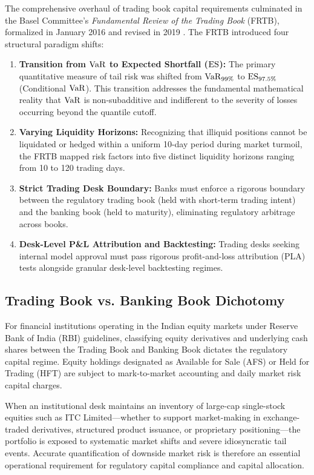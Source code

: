 The comprehensive overhaul of trading book capital requirements culminated in the Basel Committee's \textit{Fundamental Review of the Trading Book} (FRTB), formalized in January 2016 and revised in 2019 \citep{bcbs2019frtb}. The FRTB introduced four structural paradigm shifts:

\begin{enumerate}[leftmargin=1.8em, label=(\roman*)]
    \item \textbf{Transition from $\operatorname{VaR}$ to Expected Shortfall ($\operatorname{ES}$):} The primary quantitative measure of tail risk was shifted from $\operatorname{VaR}_{99\%}$ to $\operatorname{ES}_{97.5\%}$ (Conditional $\operatorname{VaR}$). This transition addresses the fundamental mathematical reality that $\operatorname{VaR}$ is non-subadditive and indifferent to the severity of losses occurring beyond the quantile cutoff.
    \item \textbf{Varying Liquidity Horizons:} Recognizing that illiquid positions cannot be liquidated or hedged within a uniform 10-day period during market turmoil, the FRTB mapped risk factors into five distinct liquidity horizons ranging from 10 to 120 trading days.
    \item \textbf{Strict Trading Desk Boundary:} Banks must enforce a rigorous boundary between the regulatory trading book (held with short-term trading intent) and the banking book (held to maturity), eliminating regulatory arbitrage across books.
    \item \textbf{Desk-Level P\&L Attribution and Backtesting:} Trading desks seeking internal model approval must pass rigorous profit-and-loss attribution (PLA) tests alongside granular desk-level backtesting regimes.
\end{enumerate}

\subsection{Trading Book vs. Banking Book Dichotomy}

For financial institutions operating in the Indian equity markets under Reserve Bank of India (RBI) guidelines, classifying equity derivatives and underlying cash shares between the Trading Book and Banking Book dictates the regulatory capital regime. Equity holdings designated as Available for Sale (AFS) or Held for Trading (HFT) are subject to mark-to-market accounting and daily market risk capital charges.

When an institutional desk maintains an inventory of large-cap single-stock equities such as ITC Limited—whether to support market-making in exchange-traded derivatives, structured product issuance, or proprietary positioning—the portfolio is exposed to systematic market shifts and severe idiosyncratic tail events. Accurate quantification of downside market risk is therefore an essential operational requirement for regulatory capital compliance and capital allocation.
